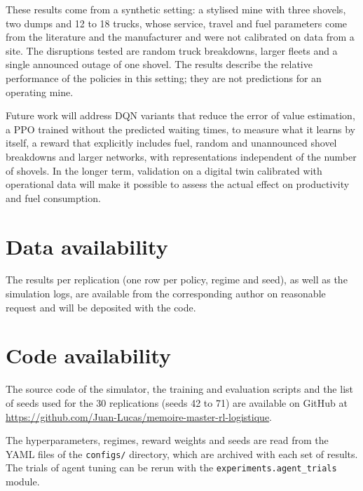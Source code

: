 \documentclass[11pt,a4paper]{article}
\newif\ifrevmarks
\newcommand{\revtag}[1]{\ifrevmarks\textsuperscript{\textcolor{red!70!black}{\scriptsize[#1]}}\fi}
\newcommand{\rev}[2]{\ifrevmarks{\color{revcolor}#2}\revtag{#1}\else#2\fi}
\newenvironment{revbloc}[1]{\par\ifrevmarks\color{revcolor}\noindent\revtag{#1}\ \fi}{\par}
\newif\ifcorrmarks
\newcommand{\corr}[1]{\ifcorrmarks\textcolor{corrcolor}{#1}\else#1\fi}
\begin{document}
\begin{revbloc}{T31}
\corr{These results come from a synthetic setting: a stylised mine with three shovels, two dumps and 12 to 18 trucks, whose service, travel and fuel parameters come from the literature and the manufacturer and were not calibrated on data from a site. The disruptions tested are random truck breakdowns, larger fleets and a single announced outage of one shovel. The results describe the relative performance of the policies in this setting; they are not predictions for an operating mine.}

Future work will address DQN variants that reduce the error of value estimation, \corr{a PPO trained without the predicted waiting times, to measure what it learns by itself,} a reward that explicitly includes fuel, \corr{random and unannounced shovel breakdowns} and larger networks, with representations independent of the number of shovels. In the longer term, validation on a digital twin calibrated with operational data will make it possible to assess the actual effect on productivity and fuel consumption.
\end{revbloc}

\newpage

\section*{Data availability}

\rev{M3}{The results per replication (one row per policy, regime and seed), as well as the simulation logs, are available from the corresponding author on reasonable request and will be deposited with the code.}

\section*{Code availability}

The source code of the simulator, the training and evaluation scripts and the list of seeds used for the 30 replications (seeds 42 to 71) are available on GitHub at \url{https://github.com/Juan-Lucas/memoire-master-rl-logistique}.

\rev{T28, v3}{The hyperparameters, regimes, reward weights and seeds are read from the YAML files of the \texttt{configs/} directory, which are archived with each set of results. The trials of agent tuning can be rerun with the \texttt{experiments.agent\_trials} module.}
\end{document}
